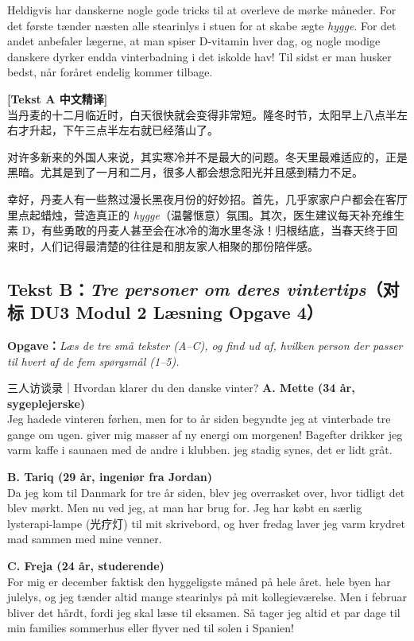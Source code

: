 Heldigvis har danskerne nogle gode tricks til at overleve de mørke måneder. For det første tænder næsten alle stearinlys i stuen for at skabe ægte \textit{hygge}. For det andet anbefaler lægerne, at man spiser D-vitamin hver dag, og nogle modige danskere dyrker endda vinterbadning i det iskolde hav! Til sidst er  man husker bedst, når foråret endelig kommer tilbage.

\begin{transbox}
\small
\textbf{\color{NCDTeal}[Tekst A 中文精译]}\\
当丹麦的十二月临近时，白天很快就会变得非常短。隆冬时节，太阳早上八点半左右才升起，下午三点半左右就已经落山了。

对许多新来的外国人来说，其实寒冷并不是最大的问题。冬天里最难适应的，正是黑暗。尤其是到了一月和二月，很多人都会想念阳光并且感到精力不足。

幸好，丹麦人有一些熬过漫长黑夜月份的好妙招。首先，几乎家家户户都会在客厅里点起蜡烛，营造真正的 \textit{hygge}（温馨惬意）氛围。其次，医生建议每天补充维生素 D，有些勇敢的丹麦人甚至会在冰冷的海水里冬泳！归根结底，当春天终于回来时，人们记得最清楚的往往是和朋友家人相聚的那份陪伴感。
\end{transbox}

\subsection*{Tekst B：\textit{Tre personer om deres vintertips}（对标 DU3 Modul 2 Læsning Opgave 4）}

\textbf{Opgave：}\textit{Læs de tre små tekster (A--C), og find ud af, hvilken person der passer til hvert af de fem spørgsmål (1--5).}

\begin{emailbox}{三人访谈录｜Hvordan klarer du den danske vinter?}
\textbf{A. Mette (34 år, sygeplejerske)}\\
Jeg hadede vinteren førhen, men for to år siden begyndte jeg at vinterbade tre gange om ugen.  giver mig masser af ny energi om morgenen! Bagefter drikker jeg varm kaffe i saunaen med de andre i klubben.  jeg stadig synes, det er lidt gråt.

\textbf{B. Tariq (29 år, ingeniør fra Jordan)}\\
Da jeg kom til Danmark for tre år siden, blev jeg overrasket over, hvor tidligt det blev mørkt. Men nu ved jeg, at  man har brug for. Jeg har købt en særlig lysterapi-lampe (光疗灯) til mit skrivebord, og hver fredag laver jeg varm krydret mad sammen med mine venner.

\textbf{C. Freja (24 år, studerende)}\\
For mig er december faktisk den hyggeligste måned på hele året.  hele byen har julelys, og jeg tænder altid mange stearinlys på mit kollegieværelse. Men i februar bliver det hårdt, fordi jeg skal læse til eksamen. Så tager jeg altid et par dage til min families sommerhus eller flyver ned til solen i Spanien!
\end{emailbox}

